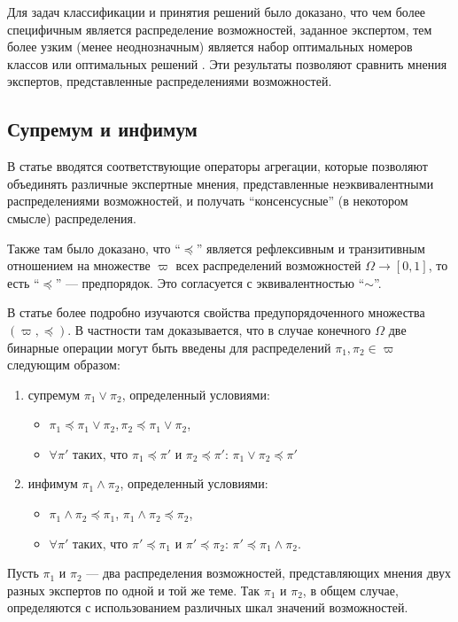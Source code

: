 \documentclass[a4paper, 14pt]{extarticle}
\begin{document}
Для задач классификации и принятия решений было доказано, что чем более специфичным является распределение возможностей, заданное экспертом, тем более узким (менее неоднозначным) является набор оптимальных номеров классов или оптимальных решений \cite{zubyuk-linz-2019, zubyuk-fss-2018}. Эти результаты позволяют сравнить мнения экспертов, представленные распределениями возможностей.

\subsection{Супремум и инфимум}

В статье \cite{zubyuk-fss-2018} вводятся соответствующие операторы агрегации, которые позволяют объединять различные экспертные мнения, представленные неэквивалентными распределениями возможностей, и получать ``консенсусные'' (в некотором смысле) распределения.

Также там было доказано, что ``$\preceq$'' является рефлексивным и транзитивным отношением на множестве $\varpi$ всех распределений возможностей $\Omega \to [0, 1]$, то есть ``$\preceq$'' --- предпорядок. Это согласуется с эквивалентностью ``$\sim$''.

В статье \cite{ag-op-2021} более подробно изучаются свойства предупорядоченного множества $(\varpi, \preceq)$. В частности там доказывается, что в случае конечного $\Omega$ две бинарные операции могут быть введены для распределений $\pi_1, \pi_2 \in \varpi$ следующим образом:
\begin{enumerate}
    \item супремум $\pi_1 \lor \pi_2$, определенный условиями:
    \begin{itemize}
        \item $\pi_1 \preceq \pi_1 \lor \pi_2, \pi_2 \preceq \pi_1 \lor \pi_2$,
        \item $\forall \pi'$ таких, что $\pi_1 \preceq \pi'$ и $\pi_2 \preceq \pi'$: $\pi_1 \lor \pi_2 \preceq \pi'$
    \end{itemize}
    \item инфимум $\pi_1 \land \pi_2$, определенный условиями:
    \begin{itemize}
        \item $\pi_1 \land \pi_2 \preceq \pi_1$, $\pi_1 \land \pi_2 \preceq \pi_2$,
        \item $\forall \pi'$ таких, что $\pi' \preceq \pi_1$ и $\pi' \preceq \pi_2$: $\pi' \preceq \pi_1 \land \pi_2$.
    \end{itemize}
\end{enumerate}
Пусть $\pi_1$ и $\pi_2$ --- два распределения возможностей, представляющих мнения двух разных экспертов по одной и той же теме. Так $\pi_1$ и $\pi_2$, в общем случае, определяются с использованием различных шкал значений возможностей.
\end{document}
